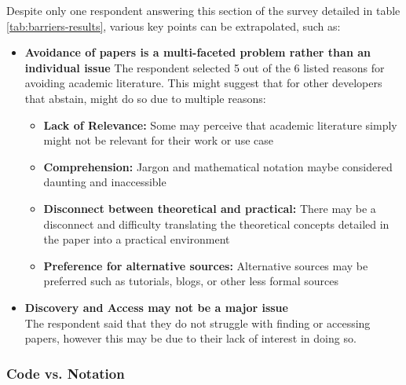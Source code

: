 Despite only one respondent answering this section of the survey detailed in table \ref{tab:barriers-results}, various key points can be extrapolated, such as:

\begin{itemize}
    \item \textbf{Avoidance of papers is a multi-faceted problem rather than an individual issue}
    The respondent selected 5 out of the 6 listed reasons for avoiding academic literature. This might suggest that for other developers that abstain, might do so due to multiple
    reasons:
    \begin{itemize}
        \item \textbf{Lack of Relevance:} Some may perceive that academic literature simply might not be relevant for their work or use case
        \item \textbf{Comprehension:} Jargon and mathematical notation maybe considered daunting and inaccessible
        \item \textbf{Disconnect between theoretical and practical:} There may be a disconnect and difficulty translating the theoretical concepts detailed in the paper into a practical environment
        \item \textbf{Preference for alternative sources:} Alternative sources may be preferred such as tutorials, blogs, or other less formal sources
    \end{itemize}

    \item \textbf{Discovery and Access may not be a major issue} \\
    The respondent said that they do not struggle with finding or accessing papers, however this may be due to their lack of interest in doing so.
\end{itemize}

\subsubsection*{Code vs. Notation}


